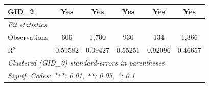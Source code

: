 \begin{table}[H]
\begin{tabular}{lccccc}
      GID\_2             & Yes                     & Yes                     & Yes                     & Yes                            & Yes\\  
      \midrule
      \emph{Fit statistics}\\
      Observations       & 606                     & 1,700                   & 930                     & 134                            & 1,366\\  
      R$^2$              & 0.51582                 & 0.39427                 & 0.55251                 & 0.92096                        & 0.46657\\  
      \midrule \midrule
      \multicolumn{6}{l}{\emph{Clustered (GID\_0) standard-errors in parentheses}}\\
      \multicolumn{6}{l}{\emph{Signif. Codes: ***: 0.01, **: 0.05, *: 0.1}}\\
   \end{tabular}
\end{table}




